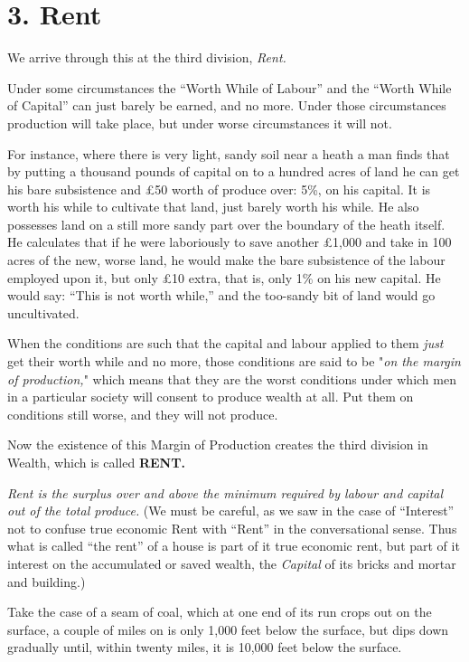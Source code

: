 \documentclass{book}
\begin{document}
\section{3. Rent}
We arrive through this at the third division, \emph{Rent.}

Under some circumstances the “Worth While of Labour” and the “Worth While of Capital” can just barely be earned, and no more. Under those circumstances production will take place, but under worse circumstances it will not.

For instance, where there is very light, sandy soil near a heath a man finds that by putting a thousand pounds of capital on to a hundred acres of land he can get his bare subsistence and £50 worth of produce over: 5\%, on his capital. It is worth his while to cultivate that land, just barely worth his while. He also possesses land on a still more sandy part over the boundary of the heath itself. He calculates that if he were laboriously to save another £1,000 and take in 100 acres of the new, worse land, he would make the bare subsistence of the labour employed upon it, but only £10 extra, that is, only 1\% on his new capital. He would say: “This is not worth while,” and the too-sandy bit of land would go uncultivated.

When the conditions are such that the capital and labour applied to them \emph{just} get their worth while and no more, those conditions are said to be "\emph{on the margin of production,}" which means that they are the worst conditions under which men in a particular society will consent to produce wealth at all. Put them on conditions still worse, and they will not produce.

Now the existence of this Margin of Production creates the third division in Wealth, which is called \textbf{RENT.}

\emph{Rent is the surplus over and above the minimum required by labour and capital out of the total produce.} (We must be careful, as we saw in the case of “Interest” not to confuse true economic Rent with “Rent” in the conversational sense. Thus what is called “the rent” of a house is part of it true economic rent, but part of it interest on the accumulated or saved wealth, the \emph{Capital} of its bricks and mortar and building.)

Take the case of a seam of coal, which at one end of its run crops out on the surface, a couple of miles on is only 1,000 feet below the surface, but dips down gradually until, within twenty miles, it is 10,000 feet below the surface.
\end{document}

